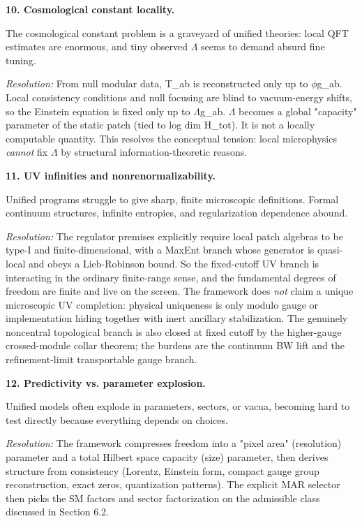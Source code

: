 \textbf{10. Cosmological constant locality.}

The cosmological constant problem is a graveyard of unified theories: local QFT estimates are enormous, and tiny observed \ensuremath{\Lambda} seems to demand absurd fine tuning.

\emph{Resolution:} From null modular data, T\_ab is reconstructed only up to \ensuremath{\phi}g\_ab. Local consistency conditions and null focusing are blind to vacuum-energy shifts, so the Einstein equation is fixed only up to \ensuremath{\Lambda}g\_ab. \ensuremath{\Lambda} becomes a global "capacity" parameter of the static patch (tied to log dim H\_tot). It is not a locally computable quantity. This resolves the conceptual tension: local microphysics \emph{cannot} fix \ensuremath{\Lambda} by structural information-theoretic reasons.

\textbf{11. UV infinities and nonrenormalizability.}

Unified programs struggle to give sharp, finite microscopic definitions. Formal continuum structures, infinite entropies, and regularization dependence abound.

\emph{Resolution:} The regulator premises explicitly require local patch algebras to be type-I and finite-dimensional, with a MaxEnt branch whose generator is quasi-local and obeys a Lieb-Robinson bound. So the fixed-cutoff UV branch is interacting in the ordinary finite-range sense, and the fundamental degrees of freedom are finite and live on the screen. The framework does \emph{not} claim a unique microscopic UV completion: physical uniqueness is only modulo gauge or implementation hiding together with inert ancillary stabilization. The genuinely noncentral topological branch is also closed at fixed cutoff by the higher-gauge crossed-module collar theorem; the burdens are the continuum BW lift and the refinement-limit transportable gauge branch.

\textbf{12. Predictivity vs. parameter explosion.}

Unified models often explode in parameters, sectors, or vacua, becoming hard to test directly because everything depends on choices.

\emph{Resolution:} The framework compresses freedom into a "pixel area" (resolution) parameter and a total Hilbert space capacity (size) parameter, then derives structure from consistency (Lorentz, Einstein form, compact gauge group reconstruction, exact zeros, quantization patterns). The explicit MAR selector then picks the SM factors and sector factorization on the admissible class discussed in Section 6.2.

